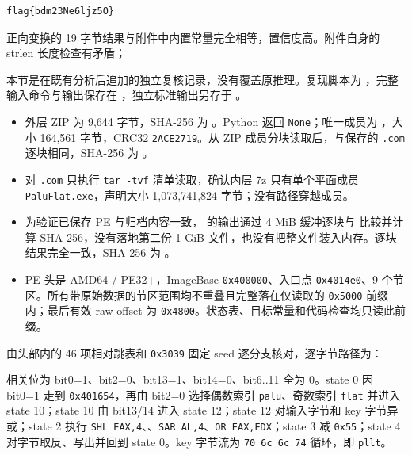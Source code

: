 \begin{verbatim}
flag{bdm23Ne6ljz5O}
\end{verbatim}

正向变换的 19 字节结果与附件中内置常量完全相等，置信度高。附件自身的 strlen 长度检查有矛盾；

本节是在既有分析后追加的独立复核记录，没有覆盖原推理。复现脚本为 \texttt{}，完整输入命令与输出保存在 \texttt{}，独立标准输出另存于 \texttt{}。

\begin{itemize}
\tightlist
\item
  外层 ZIP 为 9,644 字节，SHA-256 为 \texttt{}。Python \texttt{} 返回 \texttt{None}；唯一成员为 \texttt{}，大小 164,561 字节，CRC32 \texttt{2ACE2719}。从 ZIP 成员分块读取后，与保存的 \texttt{.com} 逐块相同，SHA-256 为 \texttt{}。
\item
  对 \texttt{.com} 只执行 \texttt{tar\ -tvf} 清单读取，确认内层 7z 只有单个平面成员 \texttt{PaluFlat.exe}，声明大小 1,073,741,824 字节；没有路径穿越成员。
\item
  为验证已保存 PE 与归档内容一致，\texttt{} 的输出通过 4 MiB 缓冲逐块与 \texttt{} 比较并计算 SHA-256，没有落地第二份 1 GiB 文件，也没有把整文件装入内存。逐块结果完全一致，SHA-256 为 \texttt{}。
\item
  PE 头是 AMD64 / PE32+，ImageBase \texttt{0x400000}、入口点 \texttt{0x4014e0}、9 个节区。所有带原始数据的节区范围均不重叠且完整落在仅读取的 \texttt{0x5000} 前缀内；最后有效 raw offset 为 \texttt{0x4800}。状态表、目标常量和代码检查均只读此前缀。
\end{itemize}

由头部内的 46 项相对跳表和 \texttt{0x3039} 固定 seed 逐分支核对，逐字节路径为：

\texttt{}

相关位为 bit0=1、bit2=0、bit13=1、bit14=0、bit6..11 全为 0。state 0 因 bit0=1 走到 \texttt{0x401654}，再由 bit2=0 选择偶数索引 \texttt{palu}、奇数索引 \texttt{flat} 并进入 state 10；state 10 由 bit13/14 进入 state 12；state 12 对输入字节和 key 字节异或；state 2 执行 \texttt{SHL\ EAX,4}、\texttt{}、\texttt{SAR\ AL,4}、\texttt{OR\ EAX,EDX}；state 3 减 \texttt{0x55}；state 4 对字节取反、写出并回到 state 0。key 字节流为 \texttt{70\ 6c\ 6c\ 74} 循环，即 \texttt{pllt}。

